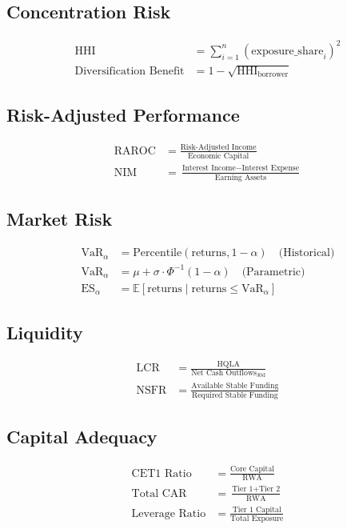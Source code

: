 \documentclass[12pt,a4paper]{article}
\begin{document}
\subsection{Concentration Risk}
\begin{align*}
\text{HHI} &= \sum_{i=1}^{n} (\text{exposure\_share}_i)^2 \\
\text{Diversification Benefit} &= 1 - \sqrt{\text{HHI}_{\text{borrower}}}
\end{align*}

\subsection{Risk-Adjusted Performance}
\begin{align*}
\text{RAROC} &= \frac{\text{Risk-Adjusted Income}}{\text{Economic Capital}} \\
\text{NIM} &= \frac{\text{Interest Income} - \text{Interest Expense}}{\text{Earning Assets}}
\end{align*}

\subsection{Market Risk}
\begin{align*}
\text{VaR}_{\alpha} &= \text{Percentile}(\text{returns}, 1-\alpha) \quad \text{(Historical)} \\
\text{VaR}_{\alpha} &= \mu + \sigma \cdot \Phi^{-1}(1-\alpha) \quad \text{(Parametric)} \\
\text{ES}_{\alpha} &= \mathbb{E}[\text{returns} \mid \text{returns} \leq \text{VaR}_{\alpha}]
\end{align*}

\subsection{Liquidity}
\begin{align*}
\text{LCR} &= \frac{\text{HQLA}}{\text{Net Cash Outflows}_{30\text{d}}} \\
\text{NSFR} &= \frac{\text{Available Stable Funding}}{\text{Required Stable Funding}}
\end{align*}

\subsection{Capital Adequacy}
\begin{align*}
\text{CET1 Ratio} &= \frac{\text{Core Capital}}{\text{RWA}} \\
\text{Total CAR} &= \frac{\text{Tier 1} + \text{Tier 2}}{\text{RWA}} \\
\text{Leverage Ratio} &= \frac{\text{Tier 1 Capital}}{\text{Total Exposure}}
\end{align*}
\end{document}
